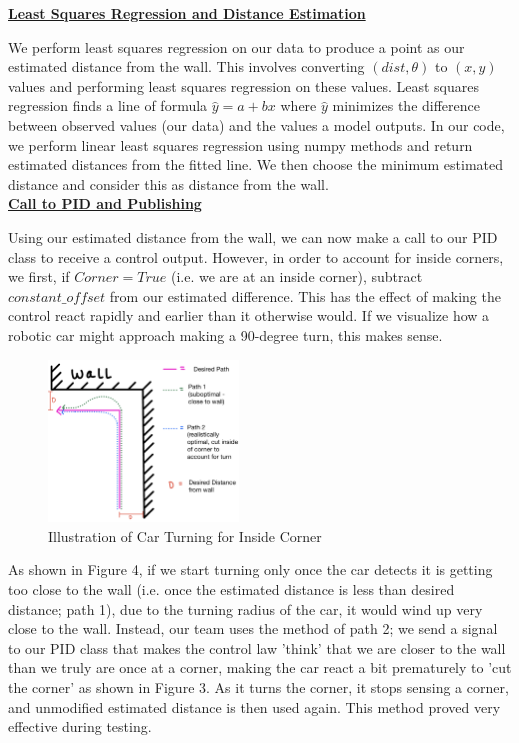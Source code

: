 \documentclass{article}
\begin{document}
\textbf{\underline{Least Squares Regression and Distance Estimation}}

We perform least squares regression on our data to produce a point as our estimated distance from the wall. This involves converting $(dist,\theta)$ to $(x,y)$ values and performing least squares regression on these values. Least squares regression finds a line of formula $\hat{y}=a+bx$ where $\hat{y}$ minimizes the difference between observed values (our data) and the values a model outputs. In our code, we perform linear least squares regression using numpy methods and return estimated distances from the fitted line. We then choose the minimum estimated distance and consider this as distance from the wall. \\

\textbf{\underline{Call to PID and Publishing}}

Using our estimated distance from the wall, we can now make a call to our PID class to receive a control output. However, in order to account for inside corners, we first, if $Corner=True$ (i.e. we are at an inside corner), subtract $constant\_offset$ from our estimated difference. This has the effect of making the control react rapidly and earlier than it otherwise would. If we visualize how a robotic car might approach making a 90-degree turn, this makes sense. \\

\begin{figure}[h]
\begin{center}
\includegraphics[width=0.45\textwidth]{TurnImg.png} %
\caption{Illustration of Car Turning for Inside Corner}
\end{center}
\label{turning}
\end{figure}

As shown in Figure 4, if we start turning only once the car detects it is getting too close to the wall (i.e. once the estimated distance is less than desired distance; path 1), due to the turning radius of the car, it would wind up very close to the wall. Instead, our team uses the method of path 2; we send a signal to our PID class that makes the control law 'think' that we are closer to the wall than we truly are once at a corner, making the car react a bit prematurely to 'cut the corner' as shown in Figure 3. As it turns the corner, it stops sensing a corner, and unmodified estimated distance is then used again. This method proved very effective during testing. \\
\end{document}
